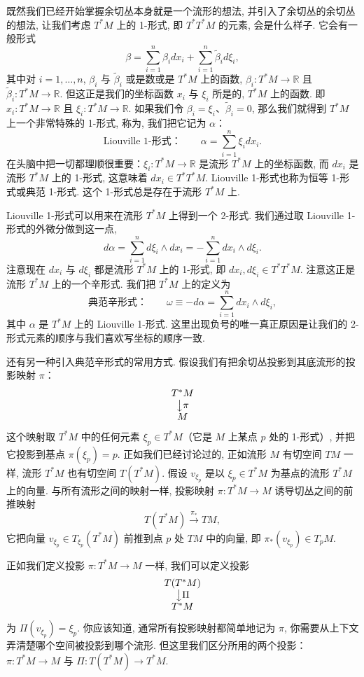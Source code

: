 既然我们已经开始掌握余切丛本身就是一个流形的想法, 并引入了余切丛的余切丛的想法, 让我们考虑 $T^*M$ 上的 1-形式, 即 $T^*T^*M$ 的元素, 会是什么样子. 它会有一般形式
\[
\beta=\sum_{i=1}^{n}\beta_idx_i+\sum_{i=1}^{n}\tilde{\beta}_id\xi_i,
\]
其中对 $i=1,\ldots,n$, $\beta_i$ 与 $\tilde{\beta}_i$ 或是数或是 $T^*M$ 上的函数, $\beta_i:T^*M\to\mathbb{R}$ 且 $\tilde{\beta}_i:T^*M\to\mathbb{R}$. 但这正是我们的坐标函数 $x_i$ 与 $\xi_i$ 所是的, $T^*M$ 上的函数. 即 $x_i:T^*M\to\mathbb{R}$ 且 $\xi_i:T^*M\to\mathbb{R}$. 如果我们令 $\beta_i=\xi_i$、$\tilde{\beta}_i=0$, 那么我们就得到 $T^*M$ 上一个非常特殊的 1-形式, 称为, 我们把它记为 $\alpha$：
\[
\text{Liouville 1-形式：}\qquad\alpha=\sum_{i=1}^{n}\xi_idx_i.
\]
在头脑中把一切都理顺很重要：$\xi_i:T^*M\to\mathbb{R}$ 是流形 $T^*M$ 上的坐标函数, 而 $dx_i$ 是流形 $T^*M$ 上的 1-形式, 这意味着 $dx_i\in T^*T^*M$. Liouville 1-形式也称为恒等 1-形式或典范 1-形式. 这个 1-形式总是存在于流形 $T^*M$ 上.

Liouville 1-形式可以用来在流形 $T^*M$ 上得到一个 2-形式. 我们通过取 Liouville 1-形式的外微分做到这一点, 
\[
d\alpha=\sum_{i=1}^{n}d\xi_i\wedge dx_i=-\sum_{i=1}^{n}dx_i\wedge d\xi_i.
\]
注意现在 $dx_i$ 与 $d\xi_i$ 都是流形 $T^*M$ 上的 1-形式, 即 $dx_i,d\xi_i\in T^*T^*M$. 注意这正是流形 $T^*M$ 上的一个辛形式. 我们把 $T^*M$ 上的定义为
\[
\text{典范辛形式：}\qquad\omega\equiv-d\alpha=\sum_{i=1}^{n}dx_i\wedge d\xi_i,
\]
其中 $\alpha$ 是 $T^*M$ 上的 Liouville 1-形式. 这里出现负号的唯一真正原因是让我们的 2-形式元素的顺序与我们喜欢写坐标的顺序一致.

还有另一种引入典范辛形式的常用方式. 假设我们有把余切丛投影到其底流形的投影映射 $\pi$：
\[
\begin{array}{c}T^*M\\\big\downarrow\pi\\M\end{array}
\]
这个映射取 $T^*M$ 中的任何元素 $\xi_p\in T^*M$（它是 $M$ 上某点 $p$ 处的 1-形式）, 并把它投影到基点 $\pi(\xi_p)=p$. 正如我们已经讨论过的, 正如流形 $M$ 有切空间 $TM$ 一样, 流形 $T^*M$ 也有切空间 $T(T^*M)$. 假设 $v_{\xi_p}$ 是以 $\xi_p\in T^*M$ 为基点的流形 $T^*M$ 上的向量. 与所有流形之间的映射一样, 投影映射 $\pi:T^*M\to M$ 诱导切丛之间的前推映射
\[
T(T^*M)\xrightarrow{\pi_*}TM,
\]
它把向量 $v_{\xi_p}\in T_{\xi_p}(T^*M)$ 前推到点 $p$ 处 $TM$ 中的向量, 即 $\pi_*(v_{\xi_p})\in T_pM$.

正如我们定义投影 $\pi:T^*M\to M$ 一样, 我们可以定义投影
\[
\begin{array}{c}T(T^*M)\\\big\downarrow\Pi\\T^*M\end{array}
\]
为 $\Pi(v_{\xi_p})=\xi_p$. 你应该知道, 通常所有投影映射都简单地记为 $\pi$, 你需要从上下文弄清楚哪个空间被投影到哪个流形. 但这里我们区分所用的两个投影：$\pi:T^*M\to M$ 与 $\Pi:T(T^*M)\to T^*M$.

